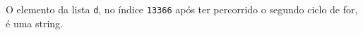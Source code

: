 \documentclass[12pt,varwidth=16cm,border=1pt]{standalone}
\begin{document}
O elemento da lista \verb+d+, no índice \verb+13366+ após ter percorrido o segundo ciclo de for, é uma string.

\questiomfalse
\end{document}

